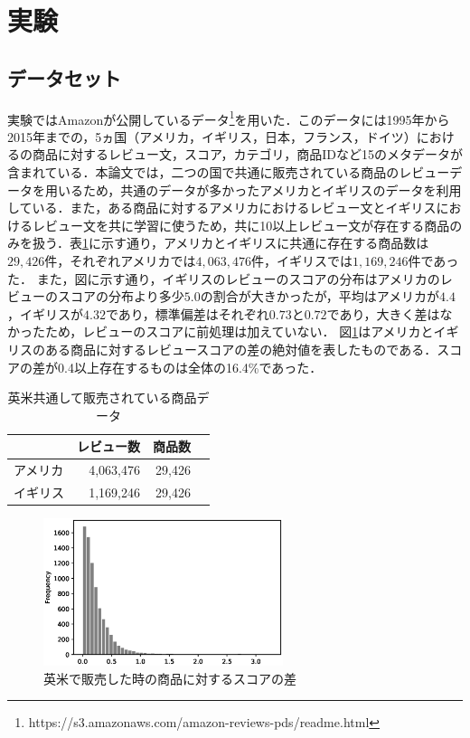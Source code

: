 \documentclass[dvipdfmx,twocolumn,10.5pt]{jsarticle}
\begin{document}
\section{実験}\label{experiment}
\subsection{データセット}\label{dataset}
実験ではAmazonが公開しているデータ\footnote{https://s3.amazonaws.com/amazon-reviews-pds/readme.html}を用いた．このデータには1995年から2015年までの，5ヵ国（アメリカ，イギリス，日本，フランス，ドイツ）におけるの商品に対するレビュー文，スコア，カテゴリ，商品IDなど15のメタデータが含まれている．本論文では，二つの国で共通に販売されている商品のレビューデータを用いるため，共通のデータが多かったアメリカとイギリスのデータを利用している．また，ある商品に対するアメリカにおけるレビュー文とイギリスにおけるレビュー文を共に学習に使うため，共に10以上レビュー文が存在する商品のみを扱う．表\ref{num_of_data}に示す通り，アメリカとイギリスに共通に存在する商品数は$29,426$件，それぞれアメリカでは$4,063,476$件，イギリスでは$1,169,246$件であった．
また，図に示す通り，イギリスのレビューのスコアの分布はアメリカのレビューのスコアの分布より多少$5.0$の割合が大きかったが，平均はアメリカが$4.4$，イギリスが$4.32$であり，標準偏差はそれぞれ$0.73$と$0.72$であり，大きく差はなかったため，レビューのスコアに前処理は加えていない．
図\ref{score_diff}はアメリカとイギリスのある商品に対するレビュースコアの差の絶対値を表したものである．スコアの差が0.4以上存在するものは全体の16.4\%であった．

\begin{table}[tb]
\centering
\caption{英米共通して販売されている商品データ}
\begin{tabular}{lrrr}
\hline
\multicolumn{1}{c}{} & \multicolumn{1}{c}{レビュー数} & \multicolumn{1}{c}{商品数} \\ \hline
アメリカ         & 4,063,476                          & 29,426             \\
イギリス         & 1,169,246                         & 29,426                 \\ \hline
\end{tabular}
\label{num_of_data}
\end{table}

\begin{figure}[tb]
	\centering
	\includegraphics[width=7cm]{images/score_diff_uk_us.eps} 
	\caption{英米で販売した時の商品に対するスコアの差}
	\label{score_diff}
\end{figure}
\end{document}
